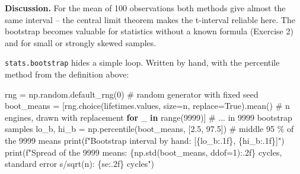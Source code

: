 \documentclass[
  letterpaper,
  DIV=11,
  numbers=noendperiod]{scrreprt}
\newenvironment{Shaded}{\begin{snugshade}}{\end{snugshade}}
\newcommand{\BuiltInTok}[1]{\textcolor[rgb]{0.00,0.23,0.31}{#1}}
\newcommand{\CommentTok}[1]{\textcolor[rgb]{0.37,0.37,0.37}{#1}}
\newcommand{\ControlFlowTok}[1]{\textcolor[rgb]{0.00,0.23,0.31}{\textbf{#1}}}
\newcommand{\DecValTok}[1]{\textcolor[rgb]{0.68,0.00,0.00}{#1}}
\newcommand{\FloatTok}[1]{\textcolor[rgb]{0.68,0.00,0.00}{#1}}
\newcommand{\KeywordTok}[1]{\textcolor[rgb]{0.00,0.23,0.31}{\textbf{#1}}}
\newcommand{\NormalTok}[1]{\textcolor[rgb]{0.00,0.23,0.31}{#1}}
\newcommand{\OperatorTok}[1]{\textcolor[rgb]{0.37,0.37,0.37}{#1}}
\newcommand{\SpecialCharTok}[1]{\textcolor[rgb]{0.37,0.37,0.37}{#1}}
\newcommand{\SpecialStringTok}[1]{\textcolor[rgb]{0.13,0.47,0.30}{#1}}
\newcommand{\VariableTok}[1]{\textcolor[rgb]{0.07,0.07,0.07}{#1}}
\begin{document}
\textbf{Discussion.} For the mean of 100 observations both methods give
almost the same interval -- the central limit theorem makes the
t-interval reliable here. The bootstrap becomes valuable for statistics
without a known formula (Exercise 2) and for small or strongly skewed
samples.

\begin{tcolorbox}[enhanced jigsaw, left=2mm, title=\textcolor{quarto-callout-note-color}{\faInfo}\hspace{0.5em}{Extension: the bootstrap by hand}, opacityback=0, breakable, rightrule=.15mm, arc=.35mm, toptitle=1mm, colbacktitle=quarto-callout-note-color!10!white, opacitybacktitle=0.6, coltitle=black, colframe=quarto-callout-note-color-frame, bottomrule=.15mm, leftrule=.75mm, bottomtitle=1mm, titlerule=0mm, toprule=.15mm, colback=white]

\texttt{stats.bootstrap} hides a simple loop. Written by hand, with the
percentile method from the definition above:

\begin{Shaded}
\begin{Highlighting}[]
\NormalTok{rng }\OperatorTok{=}\NormalTok{ np.random.default\_rng(}\DecValTok{0}\NormalTok{)                            }\CommentTok{\# random generator with fixed seed}
\NormalTok{boot\_means }\OperatorTok{=}\NormalTok{ [rng.choice(lifetimes.values, size}\OperatorTok{=}\NormalTok{n, replace}\OperatorTok{=}\VariableTok{True}\NormalTok{).mean()  }\CommentTok{\# n engines, drawn with replacement}
              \ControlFlowTok{for}\NormalTok{ \_ }\KeywordTok{in} \BuiltInTok{range}\NormalTok{(}\DecValTok{9999}\NormalTok{)]                       }\CommentTok{\# ... in 9999 bootstrap samples}
\NormalTok{lo\_b, hi\_b }\OperatorTok{=}\NormalTok{ np.percentile(boot\_means, [}\FloatTok{2.5}\NormalTok{, }\FloatTok{97.5}\NormalTok{])       }\CommentTok{\# middle 95 \% of the 9999 means}
\BuiltInTok{print}\NormalTok{(}\SpecialStringTok{f"Bootstrap interval by hand: [}\SpecialCharTok{\{}\NormalTok{lo\_b}\SpecialCharTok{:.1f\}}\SpecialStringTok{, }\SpecialCharTok{\{}\NormalTok{hi\_b}\SpecialCharTok{:.1f\}}\SpecialStringTok{]"}\NormalTok{)}
\BuiltInTok{print}\NormalTok{(}\SpecialStringTok{f"Spread of the 9999 means: }\SpecialCharTok{\{}\NormalTok{np}\SpecialCharTok{.}\NormalTok{std(boot\_means, ddof}\OperatorTok{=}\DecValTok{1}\NormalTok{)}\SpecialCharTok{:.2f\}}\SpecialStringTok{ cycles, standard error s/sqrt(n): }\SpecialCharTok{\{}\NormalTok{se}\SpecialCharTok{:.2f\}}\SpecialStringTok{ cycles"}\NormalTok{)}


\end{Highlighting}
\end{Shaded}
\end{tcolorbox}
\end{document}
